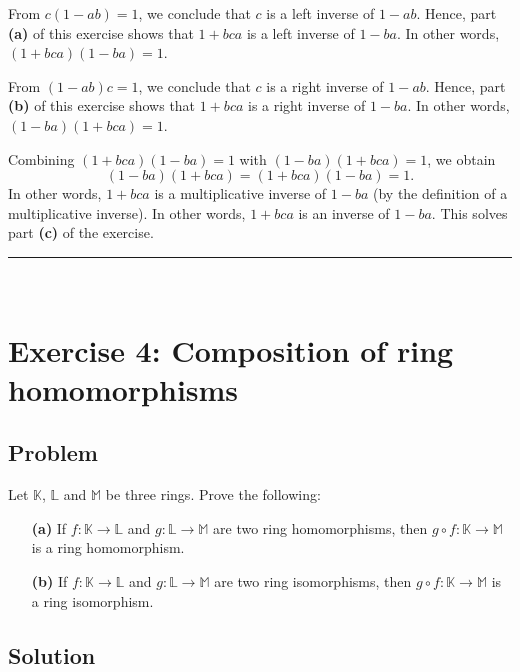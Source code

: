 \documentclass[paper=a4, fontsize=12pt]{scrartcl}%
\theoremstyle{plainsl}
\theoremstyle{definition}
\theoremstyle{remark}
\begin{document}
From $c\left(  1-ab\right)  =1$, we conclude that $c$ is a left inverse of
$1-ab$. Hence, part \textbf{(a)} of this exercise shows that $1+bca$ is a left
inverse of $1-ba$. In other words, $\left(  1+bca\right)  \left(  1-ba\right)
=1$.

From $\left(  1-ab\right)  c=1$, we conclude that $c$ is a right inverse of
$1-ab$. Hence, part \textbf{(b)} of this exercise shows that $1+bca$ is a
right inverse of $1-ba$. In other words, $\left(  1-ba\right)  \left(
1+bca\right)  =1$.

Combining $\left(  1+bca\right)  \left(  1-ba\right)  =1$ with $\left(
1-ba\right)  \left(  1+bca\right)  =1$, we obtain
\[
\left(  1-ba\right)  \left(  1+bca\right)  =\left(  1+bca\right)  \left(
1-ba\right)  =1.
\]
In other words, $1+bca$ is a multiplicative inverse of $1-ba$ (by the
definition of a multiplicative inverse). In other words, $1+bca$ is an inverse
of $1-ba$. This solves part \textbf{(c)} of the exercise.

\rule{\linewidth}{0.3pt} \\[0.4cm]

\section{Exercise 4: Composition of ring homomorphisms}

\subsection{Problem}

Let $\mathbb{K}$, $\mathbb{L}$ and $\mathbb{M}$ be three rings. Prove the following:

\begin{enumerate}
\item[\textbf{(a)}] If $f : \mathbb{K} \to\mathbb{L}$ and $g : \mathbb{L}
\to\mathbb{M}$ are two ring homomorphisms, then $g \circ f : \mathbb{K}
\to\mathbb{M}$ is a ring homomorphism.

\item[\textbf{(b)}] If $f : \mathbb{K} \to\mathbb{L}$ and $g : \mathbb{L}
\to\mathbb{M}$ are two ring isomorphisms, then $g \circ f : \mathbb{K}
\to\mathbb{M}$ is a ring isomorphism.
\end{enumerate}

\subsection{Solution}
\end{document}
